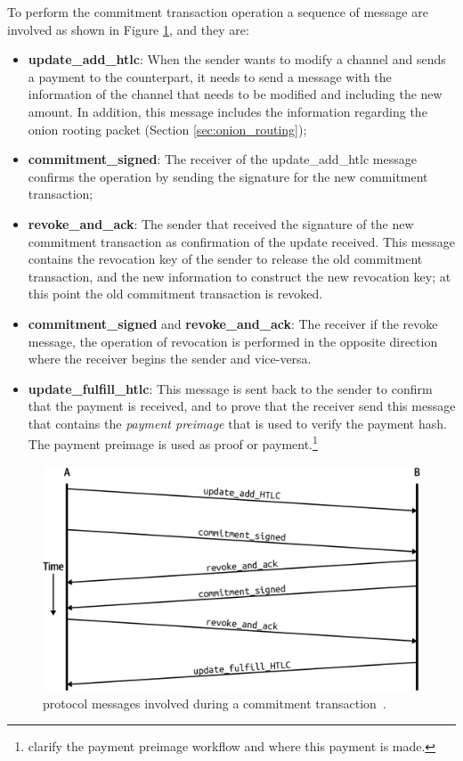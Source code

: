 To perform the commitment transaction operation a sequence of {\LN} message are involved as shown in Figure \ref{fig:commitment_transaction_ln_messages}, and they are:

\begin{itemize}
  \item {\bf update\_add\_htlc}: When the sender wants to modify a channel and sends a payment to the counterpart, it needs to send a message with the information of the channel that needs to be modified and including the new amount. In addition, this message includes  the information regarding the onion rooting packet (Section \ref{sec:onion_routing});
  
  \item {\bf commitment\_signed}: The receiver of the update\_add\_htlc message confirms the operation by sending the signature for the new commitment transaction;
  
  \item {\bf revoke\_and\_ack}: The sender that received the signature of the new commitment transaction as confirmation of the update received. This message contains the revocation key of the sender to release the old commitment transaction, and the new information to construct the new revocation key; at this point the old commitment transaction is revoked.
  
  \item {\bf commitment\_signed} and {\bf revoke\_and\_ack}: The receiver if the revoke message, the operation of revocation is performed in the opposite direction where the receiver begins the sender and vice-versa.
  
  \item {\bf update\_fulfill\_htlc}: This message is sent back to the sender to confirm that the payment is received,
      and to prove that the receiver send this message that contains the \emph{payment preimage} 
        that is used to verify the payment hash. The payment preimage is used as proof or payment.\footnote{clarify the payment preimage workflow and where this payment is made.}
\end{itemize}


\begin{figure}[h]
  \begin{center}
  \includegraphics[width=0.6\columnwidth]{imgs/mtln_0903.png}
  \end{center}
    \caption{{\LN} protocol messages involved during a commitment transaction~\cite{lnbook}.}
  \label{fig:commitment_transaction_ln_messages}
\end{figure}


